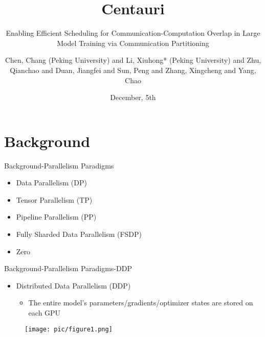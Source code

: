 \documentclass{beamer}
\author{Chen, Chang (Peking University) and Li, Xiuhong* (Peking University) and Zhu, Qianchao and Duan, Jiangfei and Sun, Peng and Zhang, Xingcheng and Yang, Chao}
\title{Centauri}
\subtitle{Enabling Efficient Scheduling for Communication-Computation Overlap in Large Model Training via Communication Partitioning}
\institute{PKU, CUHK, SHANGHAI AI LAB}
\date{December, 5th}
\begin{document}
\renewcommand{\figurename}{Fig.} %

\begin{frame}
    \titlepage
\end{frame}

\begin{frame}
    \tableofcontents[sectionstyle=show,subsectionstyle=show/shaded/hide,subsubsectionstyle=show/shaded/hide]
\end{frame}


\section{Background}

\begin{frame}{Background-Parallelism Paradigms}
    \begin{itemize}
        \item Data Parallelism (DP)
        \item Tensor Parallelism (TP)
        \item Pipeline Parallelism (PP)
        \item {\color{red}Fully Sharded Data Parallelism (FSDP)}
        \item Zero
    \end{itemize}
\end{frame}

\begin{frame}{Background-Parallelism Paradigms-DDP}
    
    \begin{itemize}
        \item Distributed Data Parallelism (DDP)
        \begin{itemize}
            \item The entire model's parameters/gradients/optimizer states are stored on each GPU
        \end{itemize}
    \end{itemize}
    \begin{figure}[h]
        \centering
        \texttt{[image: pic/figure1.png]}
    \end{figure}
\end{frame}
\end{document}
